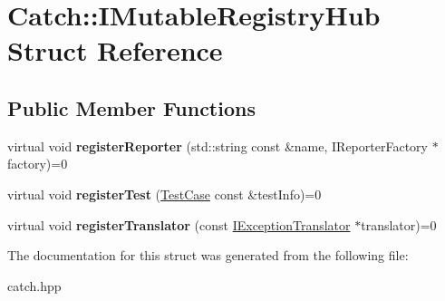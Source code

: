 \hypertarget{struct_catch_1_1_i_mutable_registry_hub}{}\section{Catch\+:\+:I\+Mutable\+Registry\+Hub Struct Reference}
\label{struct_catch_1_1_i_mutable_registry_hub}
\subsection*{Public Member Functions}
\begin{DoxyCompactItemize}
\item 
\mbox{\label{struct_catch_1_1_i_mutable_registry_hub_a1f61ed2b3f2d160b31a0f2c1d9a52af1}} 
virtual void {\bfseries register\+Reporter} (std\+::string const \&name, I\+Reporter\+Factory $\ast$factory)=0
\item 
\mbox{\label{struct_catch_1_1_i_mutable_registry_hub_a11b85c6744d88c9f83fe16ad4a8dd451}} 
virtual void {\bfseries register\+Test} (\hyperlink{class_catch_1_1_test_case}{Test\+Case} const \&test\+Info)=0
\item 
\mbox{\label{struct_catch_1_1_i_mutable_registry_hub_ae6825365102693cf7707db022a2c2b49}} 
virtual void {\bfseries register\+Translator} (const \hyperlink{struct_catch_1_1_i_exception_translator}{I\+Exception\+Translator} $\ast$translator)=0
\end{DoxyCompactItemize}


The documentation for this struct was generated from the following file\+:\begin{DoxyCompactItemize}
\item 
catch.\+hpp\end{DoxyCompactItemize}

